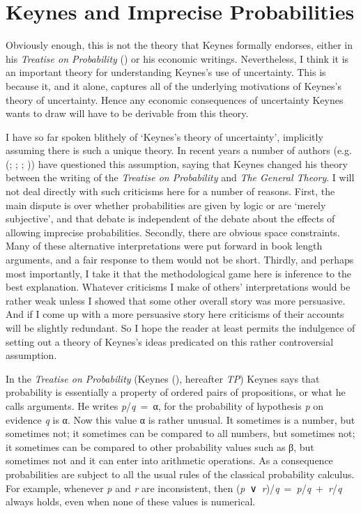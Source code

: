 \documentclass[
  11pt,
  letterpaper,
  DIV=11,
  numbers=noendperiod,
  twoside]{scrartcl}
\begin{document}
\section{Keynes and Imprecise
Probabilities}\label{keynes-and-imprecise-probabilities}

Obviously enough, this is not the theory that Keynes formally endorses,
either in his \emph{Treatise on Probability}
() or his economic writings.
Nevertheless, I think it is an important theory for understanding
Keynes's use of uncertainty. This is because it, and it alone, captures
all of the underlying motivations of Keynes's theory of uncertainty.
Hence any economic consequences of uncertainty Keynes wants to draw will
have to be derivable from this theory.

I have so far spoken blithely of `Keynes's theory of uncertainty',
implicitly assuming there is such a unique theory. In recent years a
number of authors (e.g. (;
; ; )) have questioned this
assumption, saying that Keynes changed his theory between the writing of
the \emph{Treatise on Probability} and \emph{The General Theory}. I will
not deal directly with such criticisms here for a number of reasons.
First, the main dispute is over whether probabilities are given by logic
or are `merely subjective', and that debate is independent of the debate
about the effects of allowing imprecise probabilities. Secondly, there
are obvious space constraints. Many of these alternative interpretations
were put forward in book length arguments, and a fair response to them
would not be short. Thirdly, and perhaps most importantly, I take it
that the methodological game here is inference to the best explanation.
Whatever criticisms I make of others' interpretations would be rather
weak unless I showed that some other overall story was more persuasive.
And if I come up with a more persuasive story here criticisms of their
accounts will be slightly redundant. So I hope the reader at least
permits the indulgence of setting out a theory of Keynes's ideas
predicated on this rather controversial assumption.

In the \emph{Treatise on Probability} (Keynes
(), hereafter \emph{TP}) Keynes says that
probability is essentially a property of ordered pairs of propositions,
or what he calls arguments. He writes \emph{p}/\emph{q}~=~α, for the
probability of hypothesis \emph{p} on evidence \emph{q} is α. Now this
value α is rather unusual. It sometimes is a number, but sometimes not;
it sometimes can be compared to all numbers, but sometimes not; it
sometimes can be compared to other probability values such as β, but
sometimes not and it can enter into arithmetic operations. As a
consequence probabilities are subject to all the usual rules of the
classical probability calculus. For example, whenever \emph{p} and
\emph{r} are inconsistent, then
(\emph{p}~∨~\emph{r})/\emph{q}~=~\emph{p}/\emph{q}~+~\emph{r}/\emph{q}
always holds, even when none of these values is numerical.
\end{document}
